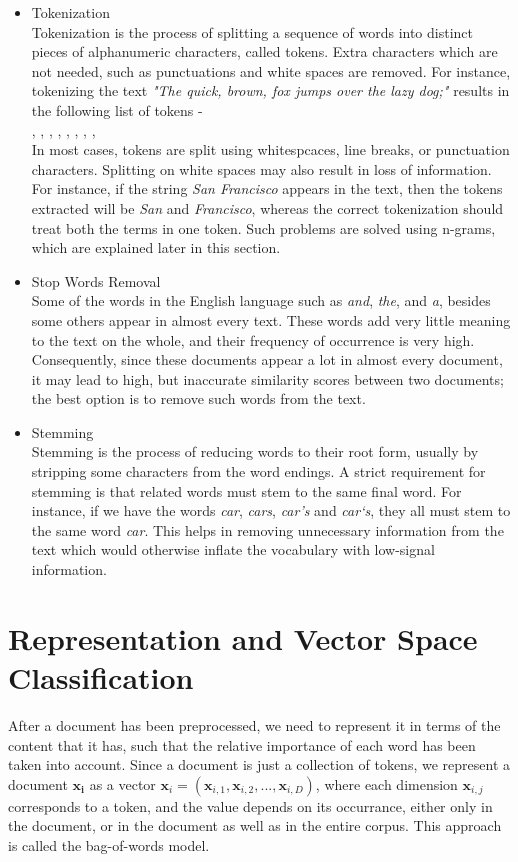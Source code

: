 \begin{itemize}
    \item{
    Tokenization\\
    Tokenization is the process of splitting a sequence of words into distinct pieces of alphanumeric characters, called tokens. Extra characters which are not needed, such as punctuations and white spaces are removed. For instance, tokenizing the text \emph{"The quick, brown, fox jumps over the lazy dog;"} results in the following list of tokens - \\
    , , , , , , , , \\
    In most cases, tokens are split using whitespcaces, line breaks, or punctuation characters. Splitting on white spaces may also result in loss of information. For instance, if the string \emph{San Francisco} appears in the text, then the tokens extracted will be \emph{San} and \emph{Francisco}, whereas the correct tokenization should treat both the terms in one token. Such problems are solved using n-grams, which are explained later in this section.
    }
    \item{
    Stop Words Removal\\
    Some of the words in the English language such as \emph{and}, \emph{the}, and \emph{a}, besides some others appear in almost every text. These words add very little meaning to the text on the whole, and their frequency of occurrence is very high. Consequently, since these documents appear a lot in almost every document, it may lead to high, but inaccurate similarity scores between two documents; the best option is to remove such words from the text.
    }
    \item{
    Stemming\\
    Stemming is the process of reducing words to their root form, usually by stripping some characters from the word endings. A strict requirement for stemming is that related words must stem to the same final word. For instance, if we have the words \emph{car}, \emph{cars}, \emph{car's} and \emph{car`s}, they all must stem to the same word \emph{car}. This helps in removing unnecessary information from the text which would otherwise inflate the vocabulary with low-signal information.
    }
\end{itemize}

\section{Representation and Vector Space Classification}
After a document has been preprocessed, we need to represent it in terms of the content that it has, such that the relative importance of each word has been taken into account. Since a document is just a collection of tokens, we represent a document $\mathbf{x_{i}}$ as a vector $\mathbf{x}_{i} = (\mathbf{x}_{i, 1}, \mathbf{x}_{i, 2}, ... , \mathbf{x}_{i, D})$, where each dimension $\mathbf{x}_{i, j}$ corresponds to a token, and the value depends on its occurrance, either only in the document, or in the document as well as in the entire corpus. This approach is called the bag-of-words model.

